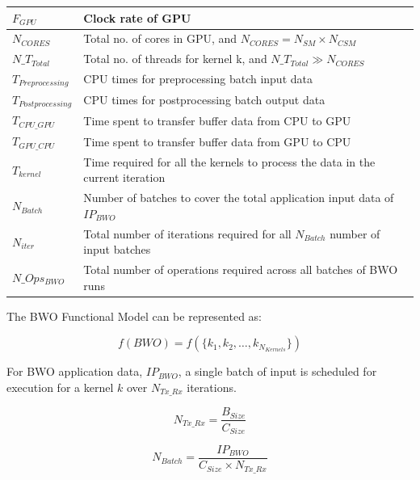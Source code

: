\documentclass[conference]{IEEEtran}
\theoremstyle{definition}
\begin{document}
\begin{table}[!t]
{\begin{tabular}{| l | >{\arraybackslash}m{2.5in} |}
\hline
$F_{GPU}$ & Clock rate of GPU\\
\hline
$N_{CORES}$ & Total no. of cores in GPU, and $N_{CORES} = N_{SM} \times N_{CSM}$\\
\hline
$N\_T_{Total}$ & Total no. of threads for kernel k, and $N\_T_{Total} \gg N_{CORES}$\\
\hline
$T_{Preprocessing}$ & CPU times for preprocessing batch input data\\
\hline
$T_{Postprocessing}$ & CPU times for postprocessing batch output data\\
\hline
$T_{CPU\_GPU}$ & Time spent to transfer buffer data from CPU to GPU\\
\hline
$T_{GPU\_CPU}$ & Time spent to transfer buffer data from GPU to CPU\\
\hline
$T_{kernel}$ & Time required for all the kernels to process the data in the current iteration\\
\hline
$N_{Batch}$ & Number of batches to cover the total application input data of $IP_{BWO}$\\
\hline
$N_{iter}$ & Total number of iterations required for all $N_{Batch}$ number of input batches\\
\hline
$N\_Ops_{BWO}$ & Total number of operations required across all batches of BWO runs\\
\hline
\end{tabular}
}
\end{table}


\par
The BWO Functional Model can be represented as: 

{\scriptsize
    \begin{equation}
    f(BWO) = f(\{k_1, k_2, \dots, k_{N_{Kernels}} \})
    \end{equation}
}%

For BWO application data, $IP_{BWO}$, a single batch of input is scheduled for execution for a kernel $k$ over $N_{Tx\_Rx}$ iterations.

{\scriptsize
    \begin{equation}
    N_{Tx\_Rx} = \frac{B_{Size}}{C_{Size}} 
    \end{equation}
}%

{\scriptsize
    \begin{equation}
    N_{Batch} = \frac{IP_{BWO}}{C_{Size} \times N_{Tx\_Rx}}
    \end{equation}
}%
\end{document}
